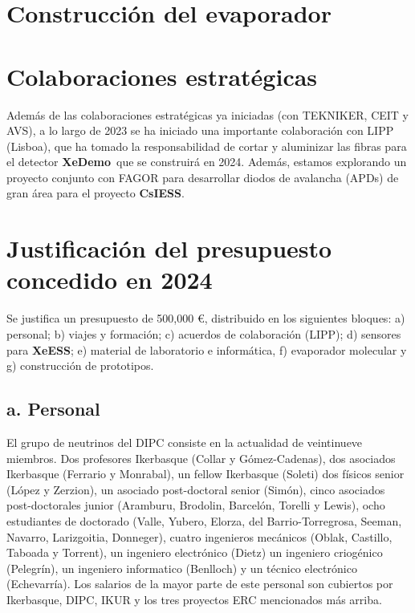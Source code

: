 \documentclass[12pt,a4paper,article]{report} %
\def\xess{{\bf XeESS}}
\def\cess{{\bf CsIESS}}
\def\xed{{\bf XeDemo}}
\begin{document}
\section*{Construcción del evaporador}

\section*{Colaboraciones estratégicas}

Además de las colaboraciones estratégicas ya iniciadas (con TEKNIKER, CEIT y AVS), a lo largo de 2023 se ha iniciado una importante colaboración con LIPP (Lisboa), que ha tomado la responsabilidad de cortar y aluminizar las fibras para el detector \xed\ que se construirá en 2024. Además, estamos explorando un proyecto conjunto con FAGOR para
desarrollar diodos de avalancha (APDs) de gran área para el proyecto \cess.


\section*{Justificación del presupuesto concedido en 2024}

Se justifica un presupuesto de 500,000 \euro, distribuido en los siguientes bloques: a) personal; b) viajes y formación; c) acuerdos de colaboración (LIPP);  d) sensores para \xess; e) material de laboratorio e informática, f) evaporador molecular y g) construcción de prototipos.

 \subsection*{a. Personal}

 El grupo de neutrinos del DIPC consiste en la actualidad de veintinueve miembros. Dos profesores Ikerbasque (Collar y Gómez-Cadenas), dos asociados Ikerbasque (Ferrario y Monrabal), un fellow Ikerbasque (Soleti) dos físicos senior (López y Zerzion), un asociado post-doctoral senior (Simón), cinco asociados post-doctorales junior (Aramburu, Brodolin, Barcelón, Torelli y Lewis), ocho estudiantes de doctorado (Valle, Yubero, Elorza, del Barrio-Torregrosa, Seeman, Navarro, Larizgoitia, Donneger), cuatro ingenieros mecánicos (Oblak, Castillo, Taboada y Torrent), un ingeniero electrónico (Dietz) un ingeniero criogénico (Pelegrín), un ingeniero informatico (Benlloch) y un técnico electrónico (Echevarría). Los salarios de la mayor parte de este personal son cubiertos por Ikerbasque, DIPC, IKUR y los tres proyectos ERC mencionados más arriba.
\end{document}

